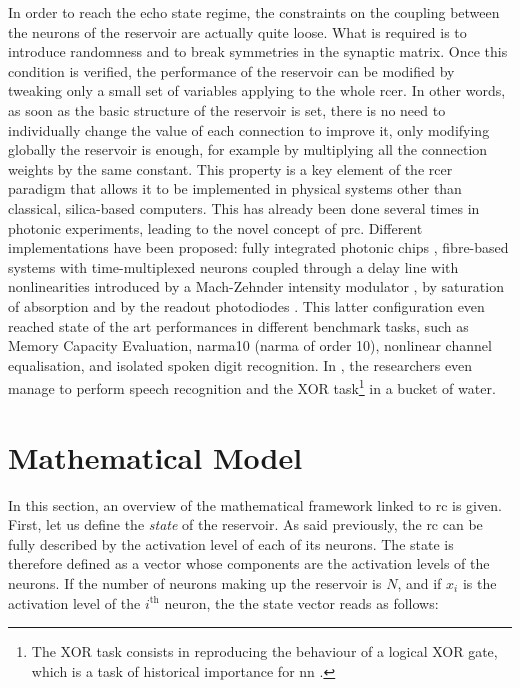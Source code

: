 In order to reach the echo state regime, the constraints on the coupling between the neurons of the reservoir are actually quite loose. What is required is to introduce randomness and to break symmetries in the synaptic matrix. Once this condition is verified, the performance of the reservoir can be modified by tweaking only a small set of variables applying to the whole \gls{rcer}. In other words, as soon as the basic structure of the reservoir is set, there is no need to individually change the value of each connection to improve it, only modifying globally the reservoir is enough, for example by multiplying all the connection weights by the same constant. This property is a key element of the \gls{rcer} paradigm that allows it to be implemented in physical systems other than classical, silica-based computers. This has already been done several times in photonic experiments, leading to the novel concept of \gls{prc}. Different implementations have been proposed: fully integrated photonic chips \cite{Vandoorne2014}, fibre-based systems with time-multiplexed neurons coupled through a delay line with nonlinearities introduced by a Mach-Zehnder intensity modulator \cite{Paquot2012, Antonik2017, Duport2016}, by saturation of absorption \cite{Dejonckheere2014, Vandoorne2008} and by the readout photodiodes \cite{Vinckier2015}. This latter configuration even reached state of the art performances in different benchmark tasks, such as Memory Capacity Evaluation, \acrshort{narma}10 (\acrlong{narma} of order 10), nonlinear channel equalisation, and isolated spoken digit recognition. In \cite{Fernando2003}, the researchers even manage to perform speech recognition and the XOR task\footnote{The XOR task consists in reproducing the behaviour of a logical XOR gate, which is a task of historical importance for \gls{nn} \cite{minsky1969perceptrons}.} in a bucket of water. 

\section{Mathematical Model}

In this section, an overview of the mathematical framework linked to \gls{rc} is given. First, let us define the \textit{state} of the reservoir. As said previously, the \gls{rc} can be fully described by the activation level of each of its neurons. The state is therefore defined as a vector whose components are the activation levels of the neurons. If the number of neurons making up the reservoir is $N$, and if $x_i$ is the activation level of the $i^{\text{th}}$ neuron, the the state vector reads as follows:

